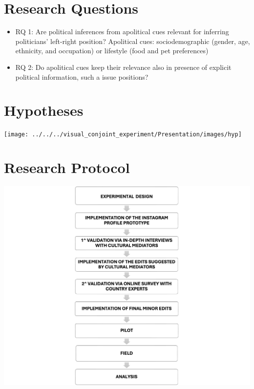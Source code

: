 \documentclass[
]{article}
\begin{document}
\section{Research Questions}\label{research-questions}

\begin{itemize}
\item
  RQ 1: Are political inferences from apolitical cues relevant for
  inferring politicians' left-right position? Apolitical cues:
  sociodemographic (gender, age, ethnicity, and occupation) or lifestyle
  (food and pet preferences)
\item
  RQ 2: Do apolitical cues keep their relevance also in presence of
  explicit political information, such a issue positions?
\end{itemize}

\section{Hypotheses}\label{hypotheses}

\begin{center}\texttt{[image: ../../../visual\_conjoint\_experiment/Presentation/images/hyp]} \end{center}

\section{Research Protocol}\label{research-protocol}

\begin{center}\includegraphics[width=0.9\linewidth]{images/diagramma} \end{center}
\end{document}
